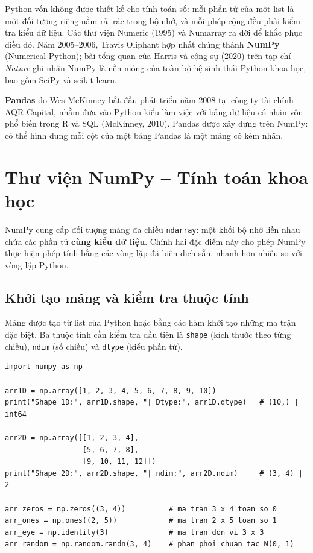 Python vốn không được thiết kế cho tính toán số: mỗi phần tử của một list là một đối tượng riêng nằm rải rác trong bộ nhớ, và mỗi phép cộng đều phải kiểm tra kiểu dữ liệu. Các thư viện Numeric (1995) và Numarray ra đời để khắc phục điều đó. Năm 2005--2006, Travis Oliphant hợp nhất chúng thành \textbf{NumPy} (Numerical Python); bài tổng quan của Harris và cộng sự (2020) trên tạp chí \textit{Nature} ghi nhận NumPy là nền móng của toàn bộ hệ sinh thái Python khoa học, bao gồm SciPy và scikit-learn.

\textbf{Pandas} do Wes McKinney bắt đầu phát triển năm 2008 tại công ty tài chính AQR Capital, nhằm đưa vào Python kiểu làm việc với bảng dữ liệu có nhãn vốn phổ biến trong R và SQL (McKinney, 2010). Pandas được xây dựng trên NumPy: có thể hình dung mỗi cột của một bảng Pandas là một mảng có kèm nhãn.

\section{Thư viện NumPy -- Tính toán khoa học}

NumPy cung cấp đối tượng mảng đa chiều \texttt{ndarray}: một khối bộ nhớ liền nhau chứa các phần tử \textbf{cùng kiểu dữ liệu}. Chính hai đặc điểm này cho phép NumPy thực hiện phép tính bằng các vòng lặp đã biên dịch sẵn, nhanh hơn nhiều so với vòng lặp Python.

\subsection{Khởi tạo mảng và kiểm tra thuộc tính}

Mảng được tạo từ list của Python hoặc bằng các hàm khởi tạo những ma trận đặc biệt. Ba thuộc tính cần kiểm tra đầu tiên là \texttt{shape} (kích thước theo từng chiều), \texttt{ndim} (số chiều) và \texttt{dtype} (kiểu phần tử).

\begin{lstlisting}[caption={Khởi tạo mảng NumPy và kiểm tra thuộc tính}]
import numpy as np

arr1D = np.array([1, 2, 3, 4, 5, 6, 7, 8, 9, 10])
print("Shape 1D:", arr1D.shape, "| Dtype:", arr1D.dtype)   # (10,) | int64

arr2D = np.array([[1, 2, 3, 4],
                  [5, 6, 7, 8],
                  [9, 10, 11, 12]])
print("Shape 2D:", arr2D.shape, "| ndim:", arr2D.ndim)     # (3, 4) | 2

arr_zeros = np.zeros((3, 4))          # ma tran 3 x 4 toan so 0
arr_ones = np.ones((2, 5))            # ma tran 2 x 5 toan so 1
arr_eye = np.identity(3)              # ma tran don vi 3 x 3
arr_random = np.random.randn(3, 4)    # phan phoi chuan tac N(0, 1)
\end{lstlisting}

